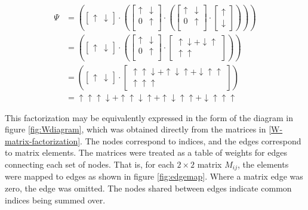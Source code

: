 \documentclass{amsbook}
\theoremstyle{plain}
\theoremstyle{definition}
\theoremstyle{remark}
\newcommand{\bmat}[4]{
\begin{bmatrix}
#1 & #2\\
#3 & #4\\
\end{bmatrix}
}
\newcommand{\paren}[1]{\left(#1\right)}
\begin{document}
$$
\begin{aligned}
  \Psi &= \paren{\begin{bmatrix}\uparrow & \downarrow \end{bmatrix}\cdot
          \paren{\bmat{\uparrow}{\downarrow}{0}{\uparrow}\cdot
          \paren{\bmat{\uparrow}{\downarrow}{0}{\uparrow}\cdot
          \begin{bmatrix}\uparrow \\ \downarrow \end{bmatrix}}}}\\
       &= \paren{\begin{bmatrix}\uparrow & \downarrow \end{bmatrix}\cdot
          \paren{\bmat{\uparrow}{\downarrow}{0}{\uparrow}\cdot
          \begin{bmatrix}\uparrow\downarrow+\downarrow\uparrow \\ \uparrow\uparrow \end{bmatrix}}}\\
       &= \paren{\begin{bmatrix}\uparrow & \downarrow \end{bmatrix}\cdot
          \begin{bmatrix}\uparrow\uparrow\downarrow+\uparrow\downarrow\uparrow+ \downarrow\uparrow\uparrow \\ \uparrow\uparrow\uparrow \end{bmatrix}}\\
       &= \uparrow\uparrow\uparrow\downarrow + \uparrow\uparrow\downarrow\uparrow + \uparrow\downarrow\uparrow\uparrow + \downarrow\uparrow\uparrow\uparrow
\end{aligned}
$$

This factorization may be equivalently expressed in the form of the diagram in figure \ref{fig:Wdiagram}, which was obtained directly from the matrices in \eqref{W-matrix-factorization}.  The nodes correspond to indices, and the edges correspond to matrix elements.  The matrices were treated as a table of weights for edges connecting each set of nodes.  That is, for each $2\times 2$ matrix $M_{ij}$, the elements were mapped to edges as shown in figure \ref{fig:edgemap}.  Where a matrix edge was zero, the edge was omitted.  The nodes shared between edges indicate common indices being summed over.
\end{document}
